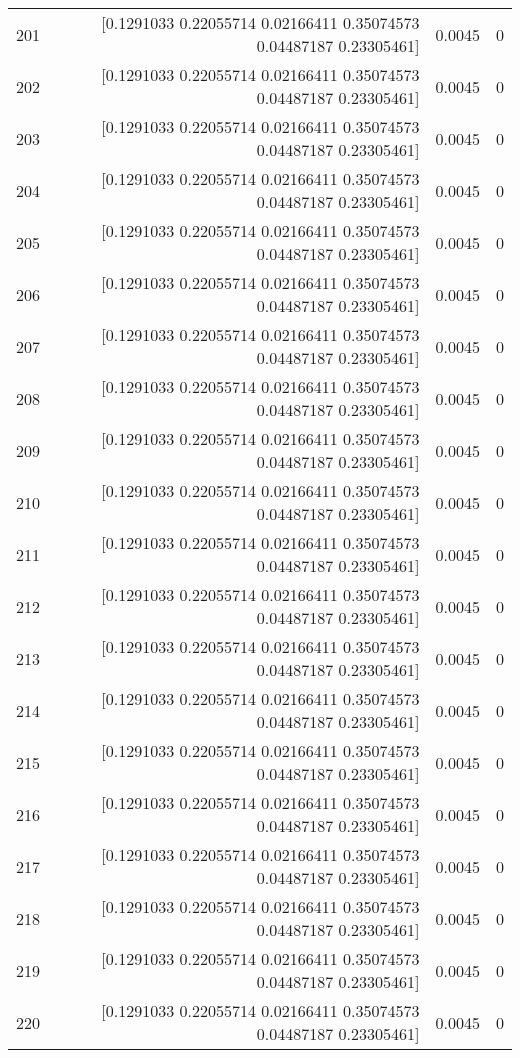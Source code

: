 \begin{longtable}{lrrr}
201 & [0.1291033  0.22055714 0.02166411 0.35074573 0.04487187 0.23305461] & 0.0045 & 0 \\
202 & [0.1291033  0.22055714 0.02166411 0.35074573 0.04487187 0.23305461] & 0.0045 & 0 \\
203 & [0.1291033  0.22055714 0.02166411 0.35074573 0.04487187 0.23305461] & 0.0045 & 0 \\
204 & [0.1291033  0.22055714 0.02166411 0.35074573 0.04487187 0.23305461] & 0.0045 & 0 \\
205 & [0.1291033  0.22055714 0.02166411 0.35074573 0.04487187 0.23305461] & 0.0045 & 0 \\
206 & [0.1291033  0.22055714 0.02166411 0.35074573 0.04487187 0.23305461] & 0.0045 & 0 \\
207 & [0.1291033  0.22055714 0.02166411 0.35074573 0.04487187 0.23305461] & 0.0045 & 0 \\
208 & [0.1291033  0.22055714 0.02166411 0.35074573 0.04487187 0.23305461] & 0.0045 & 0 \\
209 & [0.1291033  0.22055714 0.02166411 0.35074573 0.04487187 0.23305461] & 0.0045 & 0 \\
210 & [0.1291033  0.22055714 0.02166411 0.35074573 0.04487187 0.23305461] & 0.0045 & 0 \\
211 & [0.1291033  0.22055714 0.02166411 0.35074573 0.04487187 0.23305461] & 0.0045 & 0 \\
212 & [0.1291033  0.22055714 0.02166411 0.35074573 0.04487187 0.23305461] & 0.0045 & 0 \\
213 & [0.1291033  0.22055714 0.02166411 0.35074573 0.04487187 0.23305461] & 0.0045 & 0 \\
214 & [0.1291033  0.22055714 0.02166411 0.35074573 0.04487187 0.23305461] & 0.0045 & 0 \\
215 & [0.1291033  0.22055714 0.02166411 0.35074573 0.04487187 0.23305461] & 0.0045 & 0 \\
216 & [0.1291033  0.22055714 0.02166411 0.35074573 0.04487187 0.23305461] & 0.0045 & 0 \\
217 & [0.1291033  0.22055714 0.02166411 0.35074573 0.04487187 0.23305461] & 0.0045 & 0 \\
218 & [0.1291033  0.22055714 0.02166411 0.35074573 0.04487187 0.23305461] & 0.0045 & 0 \\
219 & [0.1291033  0.22055714 0.02166411 0.35074573 0.04487187 0.23305461] & 0.0045 & 0 \\
220 & [0.1291033  0.22055714 0.02166411 0.35074573 0.04487187 0.23305461] & 0.0045 & 0 \\

\end{longtable}
